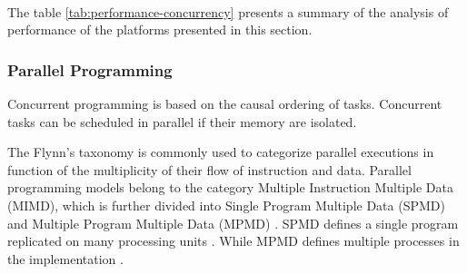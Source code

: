 
\paragraph{}

The table \ref{tab:performance-concurrency} presents a summary of the analysis of performance of the platforms presented in this section.












\subsubsection{Parallel Programming} \label{chapter3:software-performance:parallel-programming}


Concurrent programming is based on the causal ordering of tasks.
Concurrent tasks can be scheduled in parallel if their memory are isolated.

The Flynn's taxonomy \cite{Flynn1972} is commonly used to categorize parallel executions in function of the multiplicity of their flow of instruction and data.
Parallel programming models belong to the category Multiple Instruction Multiple Data (MIMD), which is further divided into Single Program Multiple Data (SPMD) \cite{Auguin1983,Darema1988,Darema2001} and Multiple Program Multiple Data (MPMD) \cite{Chang1997,Chan2004}.
SPMD defines a single program replicated on many processing units \cite{Culler,Johnson1995,K.ManiChandy2005}.
While MPMD defines multiple processes in the implementation \cite{Grimshaw1991,Foster1995b,Foster1996}.

